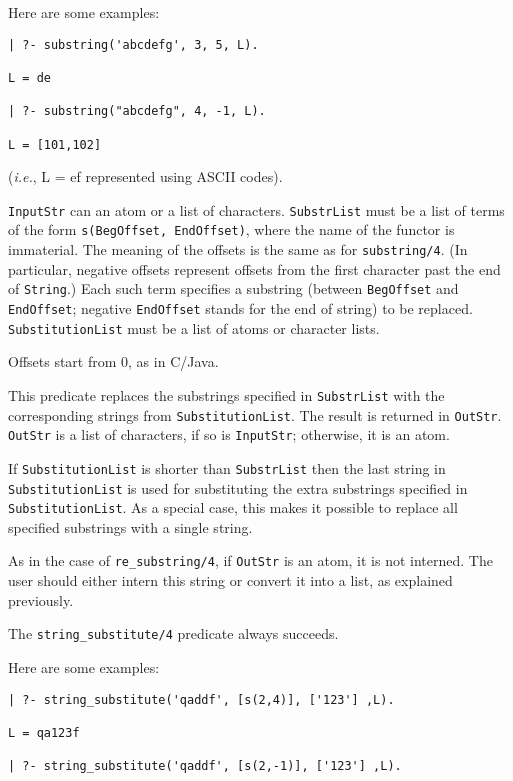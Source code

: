 \begin{description}
Here are some examples: 
\begin{verbatim}
| ?- substring('abcdefg', 3, 5, L).

L = de

| ?- substring("abcdefg", 4, -1, L).

L = [101,102]
\end{verbatim}
({\it i.e.}, L = ef represented using ASCII codes).


{\tt InputStr} can an atom or a list of characters.  {\tt SubstrList} must
be a list of terms of the form {\tt s(BegOffset, EndOffset)}, where the
name of the functor is immaterial.  The meaning of the offsets is the same
as for {\tt substring/4}. (In particular, negative offsets represent
offsets from the first character past the end of {\tt String}.)  Each such
term specifies a substring (between {\tt BegOffset} and {\tt EndOffset};
negative {\tt EndOffset} stands for the end of string) to be replaced.
{\tt SubstitutionList} must be a list of atoms or character lists.

Offsets start from 0, as in C/Java.

This predicate replaces the substrings specified in {\tt SubstrList} with
the corresponding strings from {\tt SubstitutionList}.  The result is
returned in {\tt OutStr}. {\tt OutStr} is a list of characters, if so is
{\tt InputStr}; otherwise, it is an atom.

If {\tt SubstitutionList} is shorter than {\tt SubstrList} then the last
string in {\tt SubstitutionList} is used for substituting the extra
substrings specified in {\tt SubstitutionList}. As a special case, this
makes it possible to replace all specified substrings with a single string.

As in the case of {\tt re\_substring/4}, if {\tt OutStr} is an atom, it is
not interned.  The user should either intern this string or convert it into
a list, as explained previously.

The \verb|string_substitute/4| predicate always succeeds.

Here are some examples:
\begin{verbatim}
| ?- string_substitute('qaddf', [s(2,4)], ['123'] ,L).

L = qa123f

| ?- string_substitute('qaddf', [s(2,-1)], ['123'] ,L).


\end{verbatim}
\end{description}
